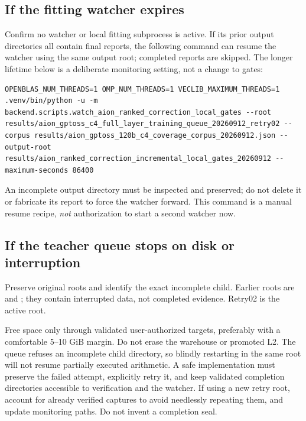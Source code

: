 \documentclass[11pt,a4paper]{article}
\begin{document}
\subsection{If the fitting watcher expires}
Confirm no watcher or local fitting subprocess is active. If its prior output
directories all contain final reports, the following command can resume the
watcher using the same output root; completed reports are skipped. The longer
lifetime below is a deliberate monitoring setting, not a change to gates:
\begin{lstlisting}
OPENBLAS_NUM_THREADS=1 OMP_NUM_THREADS=1 VECLIB_MAXIMUM_THREADS=1 .venv/bin/python -u -m backend.scripts.watch_aion_ranked_correction_local_gates --root results/aion_gptoss_c4_full_layer_training_queue_20260912_retry02 --corpus results/aion_gptoss_120b_c4_coverage_corpus_20260912.json --output-root results/aion_ranked_correction_incremental_local_gates_20260912 --maximum-seconds 86400
\end{lstlisting}
An incomplete output directory must be inspected and preserved; do not delete
it or fabricate its report to force the watcher forward. This command is a
manual resume recipe, \emph{not} authorization to start a second watcher now.

\subsection{If the teacher queue stops on disk or interruption}
Preserve original roots and identify the exact incomplete child. Earlier roots
are  and
; they
contain interrupted data, not completed evidence. Retry02 is the active root.

Free space only through validated user-authorized targets, preferably with a
comfortable 5--10 GiB margin. Do not erase the warehouse or promoted L2.
The queue refuses an incomplete child directory, so blindly restarting in the
same root will not resume partially executed arithmetic. A safe implementation
must preserve the failed attempt, explicitly retry it, and keep validated
completion directories accessible to verification and the watcher. If using a
new retry root, account for already verified captures to avoid needlessly
repeating them, and update monitoring paths. Do not invent a completion seal.
\end{document}
